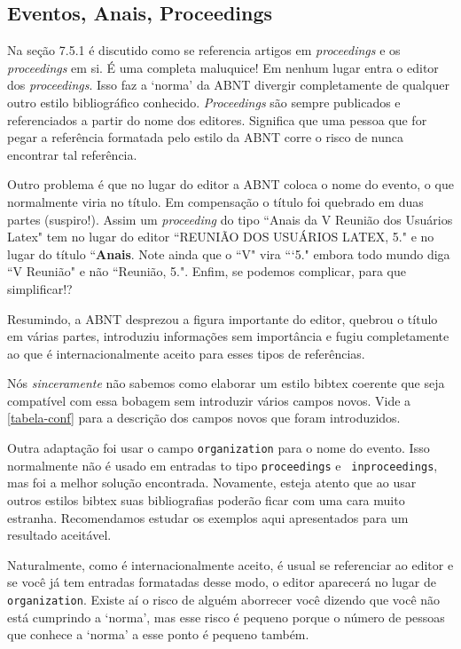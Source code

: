 \documentclass[a4paper]{ltxdoc}
\begin{document}
\subsection{Eventos, Anais, Proceedings}

Na seção 7.5.1\cite{NBR6023:2000} é discutido como se referencia artigos em
\textit{proceedings} e os \textit{proceedings} em si. É uma completa maluquice!
Em nenhum lugar entra o editor dos \textit{proceedings}. Isso faz a `norma' da
ABNT divergir completamente de qualquer outro estilo bibliográfico conhecido.
\textit{Proceedings} são sempre publicados e referenciados a partir do nome dos
editores. Significa que uma pessoa que for pegar a referência formatada pelo
estilo da ABNT corre o risco de nunca encontrar tal referência.

Outro problema é que no lugar do editor a ABNT coloca o nome do evento, o que
normalmente viria no título. Em compensação o título foi quebrado em duas partes
(suspiro!). Assim um \textit{proceeding} do tipo ``Anais da V Reunião dos
Usuários Latex" tem no lugar do editor ``REUNIÃO DOS USUÁRIOS LATEX, 5." e no lugar
do título ``{\bf Anais}. Note ainda que o ``V" vira ```5." embora
todo mundo diga ``V Reunião" e não ``Reunião, 5.". Enfim, se podemos complicar,
para que simplificar!?

Resumindo, a ABNT desprezou a figura importante do editor, quebrou o título
em várias partes, introduziu informações sem importância e fugiu completamente
ao que é internacionalmente aceito para esses tipos de referências.

Nós \emph{sinceramente} não sabemos como elaborar um estilo \textsf{bibtex}
coerente que seja compatível com essa bobagem sem introduzir vários campos novos.
Vide a \autoref{tabela-conf} para a descrição dos campos novos que foram
introduzidos.

Outra adaptação foi usar o campo {\tt organization} para o nome do evento. Isso
normalmente não é usado em entradas to tipo {\tt proceedings} e {\tt
inproceedings}, mas foi a melhor solução encontrada. Novamente, esteja atento
que ao usar outros estilos \textsf{bibtex} suas bibliografias poderão ficar com
uma cara muito estranha. Recomendamos estudar os exemplos aqui apresentados para
um resultado aceitável.

Naturalmente, como é internacionalmente aceito, é usual se referenciar ao
editor e se você já tem entradas formatadas desse modo, o editor aparecerá
no lugar de {\tt organization}. Existe aí o risco de alguém aborrecer você
dizendo que você não está cumprindo a `norma', mas esse risco é pequeno
porque o número de pessoas que conhece a `norma' a esse ponto é
pequeno também.
\end{document}
